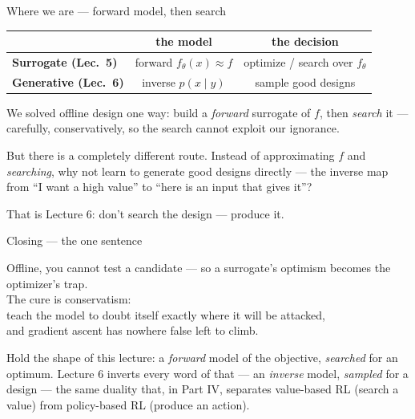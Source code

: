 \documentclass[10pt, aspectratio=169]{beamer}
\begin{document}
\begin{frame}{Where we are --- forward model, then search}
\vspace{2pt}
\begin{center}\footnotesize\renewcommand{\arraystretch}{1.45}
\begin{tabular}{l|c|c}
 & \textbf{the model} & \textbf{the decision} \\
\hline
\textbf{Surrogate (Lec.\ 5)} & \cellcolor{mDarkTeal!15}forward $f_\theta(x)\approx f$ & \cellcolor{mDarkTeal!15}optimize / search over $f_\theta$ \\
\textbf{Generative (Lec.\ 6)} & inverse $p(x\mid y)$ & sample good designs \\
\end{tabular}
\end{center}
\medskip

\pause
We solved offline design one way: build a \emph{forward} surrogate of $f$, then \emph{search} it --- carefully, conservatively, so the search cannot exploit our ignorance.
\medskip

\pause
But there is a completely different route. Instead of approximating $f$ and \emph{searching}, why not learn to \alert{generate} good designs directly --- the inverse map from ``I want a high value'' to ``here is an input that gives it''?
\begin{center}\large
That is Lecture 6: don't search the design --- \alert{produce} it.
\end{center}
\end{frame}

\begin{frame}{Closing --- the one sentence}
\vfill
\begin{center}\large
Offline, you cannot test a candidate --- so a surrogate's optimism becomes the optimizer's trap.\\[8pt]
The cure is conservatism:\\[4pt]
teach the model to doubt itself exactly where it will be attacked,\\[4pt]
and gradient ascent has nowhere false left to climb.
\end{center}
\vfill
\pause
\footnotesize
Hold the shape of this lecture: a \emph{forward} model of the objective, \emph{searched} for an optimum. Lecture 6 inverts every word of that --- an \emph{inverse} model, \emph{sampled} for a design --- the same duality that, in Part IV, separates value-based RL (search a value) from policy-based RL (produce an action).
\end{frame}
\end{document}
